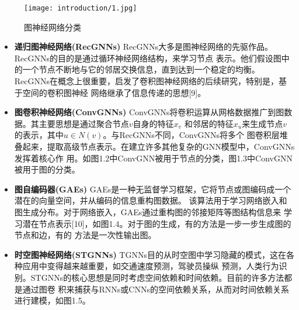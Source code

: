 \begin{figure}[ht]
    \centering
    \texttt{[image: introduction/1.jpg]}
    \caption{\label{1-1}图神经网络分类}
\end{figure}

\begin{itemize}
    \item \textbf{递归图神经网络(RecGNNs)} \quad
    RecGNNs大多是图神经网络的先驱作品。RecGNNs的目的是通过循环神经网络结构，来学习节点
    表示。他们假设图中的一个节点不断地与它的邻居交换信息，直到达到一个稳定的均衡。
    RecGNNs在概念上很重要，启发了卷积图神经网络的后续研究，特别是，基于空间的卷积图神经
    网络继承了信息传递的思想[9]。
    
    \item \textbf{图卷积神经网络(ConvGNNs)} \quad
    ConvGNNs将卷积运算从网格数据推广到图数据。其主要思想是通过聚合节点$v$自身的特征$x_{v}$
    和邻居的特征$x_{u}$来生成节点$v$的表示，其中$u\in N(v)$。与RecGNNs不同，ConvGNNs将多个
    图卷积层堆叠起来，提取高级节点表示。在建立许多其他复杂的GNN模型中，ConvGNNs发挥着核心作
    用。如图1.2中ConvGNN被用于节点的分类，图1.3中ConvGNN被用于图的分类。

    \item \textbf{图自编码器(GAEs)} \quad
    GAEs是一种无监督学习框架，它将节点或图编码成一个潜在的向量空间，并从编码的信息重构图数据。
    该算法用于学习网络嵌入和图生成分布。对于网络嵌入，GAEs通过重构图的邻接矩阵等图结构信息来
    学习潜在节点表示[10]，如图1.4。对于图的生成，有的方法是一步一步生成图的节点和边，有的
    方法是一次性输出图。

    \item \textbf{时空图神经网络(STGNNs)} \quad
    TGNNs目的从时空图中学习隐藏的模式，这在各种应用中变得越来越重要，如交通速度预测，驾驶员操纵
    预测，人类行为识别。STGNNs的核心思想是同时考虑空间依赖和时间依赖。目前的许多方法都是通过图卷
    积来捕获与RNNs或CNNs的空间依赖关系，从而对时间依赖关系进行建模，如图1.5。
\end{itemize}

